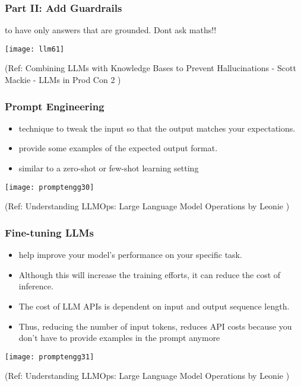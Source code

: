 \begin{frame}[fragile]\frametitle{Part II: Add Guardrails}

to have only answers that are grounded. Dont ask maths!!

\begin{center}
\texttt{[image: llm61]}
\end{center}		


{\tiny (Ref: Combining LLMs with Knowledge Bases to Prevent Hallucinations - Scott Mackie - LLMs in Prod Con 2 )}

\end{frame}



\begin{frame}[fragile]\frametitle{Prompt Engineering}

\begin{itemize}
\item technique to tweak the input so that the output matches your expectations. 
\item provide some examples of the expected output format. 
\item similar to a zero-shot or few-shot learning setting
\end{itemize}	

\begin{center}
\texttt{[image: promptengg30]}
\end{center}		

{\tiny (Ref: Understanding LLMOps: Large Language Model Operations by Leonie )}

\end{frame}



\begin{frame}[fragile]\frametitle{Fine-tuning LLMs}

\begin{itemize}
\item help improve your model's performance on your specific task. 
\item Although this will increase the training efforts, it can reduce the cost of inference. 
\item The cost of LLM APIs is dependent on input and output sequence length. 
\item Thus, reducing the number of input tokens, reduces API costs because you don't have to provide examples in the prompt anymore
\end{itemize}	

\begin{center}
\texttt{[image: promptengg31]}
\end{center}		

{\tiny (Ref: Understanding LLMOps: Large Language Model Operations by Leonie )}

\end{frame}

